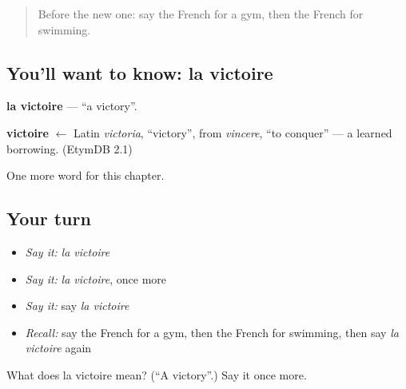 \label{lesson:FR-C173-victoire}



\begin{quote}
Before the new one: say the French for a gym, then the French for swimming.
\end{quote}

\subsection*{You'll want to know: la victoire}
\textbf{la victoire} — \textquotedblleft{}a victory\textquotedblright{}.

\begin{cousinweb}
\textbf{victoire} $\leftarrow$ Latin \emph{victoria}, \textquotedblleft{}victory\textquotedblright{}, from \emph{vincere}, \textquotedblleft{}to conquer\textquotedblright{} — a learned borrowing. (EtymDB 2.1)
\end{cousinweb}

\begin{grammarlens}[title={What you've built}]
One more word for this chapter.
\end{grammarlens}

\subsection*{Your turn}
\begin{itemize}
\raggedright
  \item \emph{Say it:} \emph{la victoire}
  \item \emph{Say it:} \emph{la victoire}, once more
  \item \emph{Say it:} say \emph{la victoire}
  \item \emph{Recall:} say the French for a gym, then the French for swimming, then say \emph{la victoire} again
\end{itemize}

\begin{tcolorbox}[breakable,colback=teal!4,colframe=teal!35!black,title={Before you move on}]
What does la victoire mean? (\textquotedblleft{}A victory\textquotedblright{}.) Say it once more.
\end{tcolorbox}
